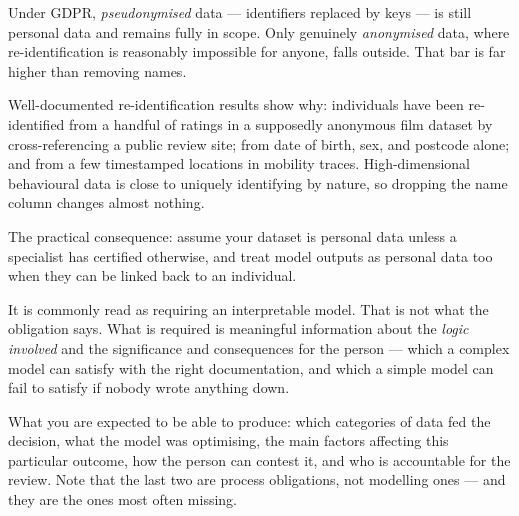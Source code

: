 \begin{cautionbox}
Under GDPR, \emph{pseudonymised} data --- identifiers replaced by keys --- is
still personal data and remains fully in scope. Only genuinely
\emph{anonymised} data, where re-identification is reasonably impossible for
anyone, falls outside. That bar is far higher than removing names.

Well-documented re-identification results show why: individuals have been
re-identified from a handful of ratings in a supposedly anonymous film dataset
by cross-referencing a public review site; from date of birth, sex, and postcode
alone; and from a few timestamped locations in mobility traces. High-dimensional
behavioural data is close to uniquely identifying by nature, so dropping the
name column changes almost nothing.

The practical consequence: assume your dataset is personal data unless a
specialist has certified otherwise, and treat model outputs as personal data too
when they can be linked back to an individual.
\end{cautionbox}

\begin{cautionbox}
It is commonly read as requiring an interpretable model. That is not what the
obligation says. What is required is meaningful information about the
\emph{logic involved} and the significance and consequences for the person ---
which a complex model can satisfy with the right documentation, and which a
simple model can fail to satisfy if nobody wrote anything down.

What you are expected to be able to produce: which categories of data fed the
decision, what the model was optimising, the main factors affecting this
particular outcome, how the person can contest it, and who is accountable for
the review. Note that the last two are process obligations, not modelling ones
--- and they are the ones most often missing.
\end{cautionbox}

